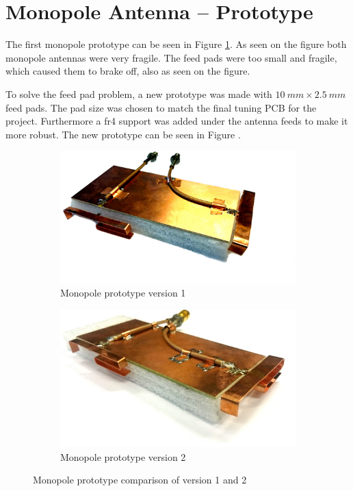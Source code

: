 \section{Monopole Antenna -- Prototype}
The first monopole prototype can be seen in Figure \ref{fig:ant1_proto1_3d}. As seen on the figure both monopole antennas were very fragile. The feed pads were too small and fragile, which caused them to brake off, also as seen on the figure.

To solve the feed pad problem, a new prototype was made with $\SI{10}{mm}\times \SI{2.5}{mm}$ feed pads. The pad size was chosen to match the final tuning PCB for the project. Furthermore a fr4 support was added under the antenna feeds to make it more robust. The new prototype can be seen in Figure .

\begin{figure}[htbp]
   \begin{subfigure}[b]{0.49\linewidth}
        \centering
        \includegraphics[scale=0.2]{img/tech_sol/monopole/prototype_v1/monopole_v1}
        \caption{Monopole prototype version 1}
        \label{fig:ant1_proto1_3d}
    \end{subfigure}
    \hfill
    \begin{subfigure}[b]{0.49\linewidth}
        \centering
        \includegraphics[scale=0.27]{img/tech_sol/monopole/prototype_v2/monopole_v2}
        \caption{Monopole prototype version 2}
        \label{fig:ant1_proto2_3d}
    \end{subfigure}
    \caption{Monopole prototype comparison of version 1 and 2}
    \label{fig:ant_1_proto_3d}
\end{figure}

